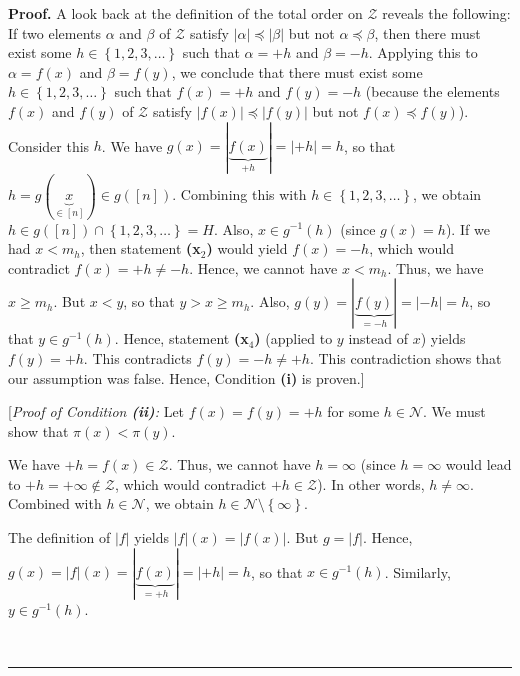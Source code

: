 \documentclass[numbers=enddot,12pt,final,onecolumn,notitlepage]{scrartcl}%
\theoremstyle{definition}
\newenvironment{proof}[1][Proof]{\noindent\textbf{#1.} }{\ \rule{0.5em}{0.5em}}
\newenvironment{verlong}{}{}
\begin{document}
\begin{verlong}
\begin{proof}
A look back at the definition of the total order on $\mathcal{Z}$ reveals the
following: If two elements $\alpha$ and $\beta$ of $\mathcal{Z}$ satisfy
$\left\vert \alpha\right\vert \preccurlyeq\left\vert \beta\right\vert $ but
not $\alpha\preccurlyeq\beta$, then there must exist some $h\in\left\{
1,2,3,\ldots\right\}  $ such that $\alpha=+h$ and $\beta=-h$. Applying this to
$\alpha=f\left(  x\right)  $ and $\beta=f\left(  y\right)  $, we conclude that
there must exist some $h\in\left\{  1,2,3,\ldots\right\}  $ such that
$f\left(  x\right)  =+h$ and $f\left(  y\right)  =-h$ (because the elements
$f\left(  x\right)  $ and $f\left(  y\right)  $ of $\mathcal{Z}$ satisfy
$\left\vert f\left(  x\right)  \right\vert \preccurlyeq\left\vert f\left(
y\right)  \right\vert $ but not $f\left(  x\right)  \preccurlyeq f\left(
y\right)  $). Consider this $h$. We have $g\left(  x\right)  =\left\vert
\underbrace{f\left(  x\right)  }_{+h}\right\vert =\left\vert +h\right\vert
=h$, so that $h=g\left(  \underbrace{x}_{\in\left[  n\right]  }\right)  \in
g\left(  \left[  n\right]  \right)  $. Combining this with $h\in\left\{
1,2,3,\ldots\right\}  $, we obtain $h\in g\left(  \left[  n\right]  \right)
\cap\left\{  1,2,3,\ldots\right\}  =H$. Also, $x\in g^{-1}\left(  h\right)  $
(since $g\left(  x\right)  =h$). If we had $x<m_{h}$, then statement
\textbf{(x}$_{2}$\textbf{)} would yield $f\left(  x\right)  =-h$, which would
contradict $f\left(  x\right)  =+h\neq-h$. Hence, we cannot have $x<m_{h}$.
Thus, we have $x\geq m_{h}$. But $x<y$, so that $y>x\geq m_{h}$. Also,
$g\left(  y\right)  =\left\vert \underbrace{f\left(  y\right)  }%
_{=-h}\right\vert =\left\vert -h\right\vert =h$, so that $y\in g^{-1}\left(
h\right)  $. Hence, statement \textbf{(x}$_{4}$\textbf{)} (applied to $y$
instead of $x$) yields $f\left(  y\right)  =+h$. This contradicts $f\left(
y\right)  =-h\neq+h$. This contradiction shows that our assumption was false.
Hence, Condition \textbf{(i)} is proven.]

[\textit{Proof of Condition \textbf{(ii)}:} Let $f\left(  x\right)  =f\left(
y\right)  =+h$ for some $h\in\mathcal{N}$. We must show that $\pi\left(
x\right)  <\pi\left(  y\right)  $.

We have $+h=f\left(  x\right)  \in\mathcal{Z}$. Thus, we cannot have
$h=\infty$ (since $h=\infty$ would lead to $+h=+\infty\notin\mathcal{Z}$,
which would contradict $+h\in\mathcal{Z}$). In other words, $h\neq\infty$.
Combined with $h\in\mathcal{N}$, we obtain $h\in\mathcal{N}\setminus\left\{
\infty\right\}  $.

The definition of $\left\vert f\right\vert $ yields $\left\vert f\right\vert
\left(  x\right)  =\left\vert f\left(  x\right)  \right\vert $. But
$g=\left\vert f\right\vert $. Hence, $g\left(  x\right)  =\left\vert
f\right\vert \left(  x\right)  =\left\vert \underbrace{f\left(  x\right)
}_{=+h}\right\vert =\left\vert +h\right\vert =h$, so that $x\in g^{-1}\left(
h\right)  $. Similarly, $y\in g^{-1}\left(  h\right)  $.


\end{proof}
\end{verlong}
\end{document}
